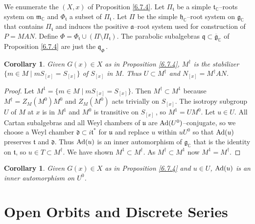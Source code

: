 \documentclass{conm-p-l}
\newtheorem{corollary}[equation]{Corollary}
\renewcommand{\gg}{\mathfrak{g}}
\newcommand{\gq}{\mathfrak{q}}
\def\ga{\mathfrak{a}}
\def\gd{\mathfrak{d}}
\def\gg{\mathfrak{g}}
\def\gh{\mathfrak{h}}
\def\gm{\mathfrak{m}}
\def\gq{\mathfrak{q}}
\def\gt{\mathfrak{t}}
\def\gu{\mathfrak{u}}
\def\Ad{{\rm Ad}}
\def\C{\mathbb{C}}
\begin{document}
We enumerate the $(X,x)$ of Proposition \ref{6.7.4}.  Let $\Pi_\gt$ be a
simple $\gt_\C$--roots system on $\gm_\C$ and $\Phi_\gt$ a subset of 
$\Pi_\gt$\,.  Let $\Pi$ be the simple $\gh_\C$--root system on $\gg_\C$
that contains $\Pi_\gt$ and induces the positive $\ga$--root
system used for construction of $P=MAN$.  Define 
$\Phi = \Phi_\gt \cup (\Pi \setminus \Pi_\gt)$.  The parabolic subalgebras
$\gq \subset \overline{\gg}_\C$ of Proposition \ref{6.7.4} are just the
$\gq_\Phi$\,.

\begin{corollary}\label{6.7.7} Given $G(x) \in X$ as in {\rm Proposition
\ref{6.7.4}}, $M^\dagger$ is the stabilizer 
$\{m \in M \mid mS_{[x]} = S_{[x]}\}$ of $S_{[x]}$ in $M$.   Thus
$U \subset M^\dagger$ and $N_{[x]} = M^\dagger AN$.
\end{corollary}

\begin{proof}
Let $M^1 = \{m \in M \mid mS_{[x]} = S_{[x]}\}$.  Then $M^\dagger \subset M^1$
because $M^\dagger = Z_M(M^0)M^0$ and $Z_M(M^0)$ acts trivially on $S_{[x]}$.
The isotropy subgroup $U$ of $M$ at $x$ is in $M^1$ and $M^0$ is transitive
on $S_{[x]}$\,, so $M^1 = UM^0$.  Let $u \in U$.  All Cartan subalgebras and 
all Weyl chambers of $\gu$ are $\Ad(U^0)$--conjugate, so we choose a
Weyl chamber $\gd \subset i\gt^*$ for $\gu$ and replace $u$ within $uU^0$
so that $\Ad(u)$ preserves $\gt$ and $\gd$.  Thus $\Ad(u)$ is an inner
automorphism of $\gg_\C$ that is the identity on $\gt$, so 
$u \in T \subset M^\dagger$.  We have shown $M^1 \subset M^\dagger$.
As $M^\dagger \subset M^1$ now $M^1 = M^\dagger$.
\end{proof}

\begin{corollary}\label{6.7.8} Given $G(x) \in X$ as in {\rm Proposition
\ref{6.7.4}} and $u \in U$, $\Ad(u)$ is an inner automorphism on $U^0$.
\end{corollary}

\section{Open Orbits and Discrete Series}
\label{sec7}
\setcounter{equation}{0}
\end{document}

